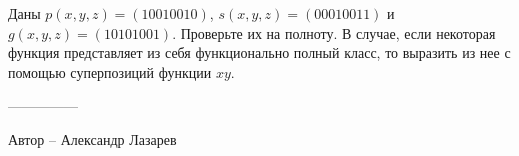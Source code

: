\question
Даны $p(x, y, z) = (10010010)$, $s(x, y, z) = (00010011)$ и $g(x, y, z) = (10101001)$. Проверьте их на полноту. В случае, если некоторая  функция представляет из себя функционально полный класс, то выразить из нее с помощью суперпозиций функции $xy$.

---------------

Автор -- Александр Лазарев